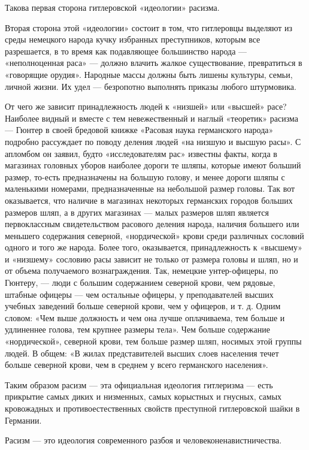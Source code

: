 \documentclass[12pt, a4paper, openany]{book}
\begin{document}
Такова первая сторона гитлеровской «идеологии» расизма.

Вторая сторона этой «идеологии» состоит в том, что гитлеровцы выделяют из среды немецкого народа кучку избранных преступников, которым все разрешается, в то время как подавляющее большинство народа — «неполноценная раса» — должно влачить жалкое существование, превратиться в «говорящие орудия». Народные массы должны быть лишены культуры, семьи, личной жизни. Их удел — безропотно выполнять приказы любого штурмовика.

От чего же зависит принадлежность людей к «низшей» или «высшей» расе? Наиболее видный и вместе с тем невежественный и наглый «теоретик» расизма — Гюнтер в своей бредовой книжке «Расовая наука германского народа» подробно рассуждает по поводу деления людей «на низшую и высшую расы». С апломбом он заявил, будто «исследователям рас» известны факты, когда в магазинах головных уборов наиболее дороги те шляпы, которые имеют больший размер, то-есть предназначены на большую голову, и менее дороги шляпы с маленькими номерами, предназначенные на небольшой размер головы. Так вот оказывается, что наличие в магазинах некоторых германских городов больших размеров шляп, а в других магазинах — малых размеров шляп является первоклассным свидетельством расового деления народа, наличия большего или меньшего содержания северной, «нордической» крови среди различных сословий одного и того же народа. Более того, оказывается, принадлежность к «высшему» и «низшему» сословию расы зависит не только от размера головы и шляп, но и от объема получаемого вознаграждения. Так, немецкие унтер-офицеры, по Гюнтеру, — люди с большим содержанием северной крови, чем рядовые, штабные офицеры — чем остальные офицеры, у преподавателей высших учебных заведений больше северной крови, чем у офицеров, и т. д. Одним словом: «Чем выше должность и чем она лучше оплачиваема, тем больше и удлиненнее голова, тем крупнее размеры тела». Чем больше содержание «нордической», северной крови, тем больше размер шляп, носимых этой группы людей. В общем: «В жилах представителей высших слоев населения течет больше северной крови, чем в среднем у всего германского населения».


Таким образом расизм — эта официальная идеология гитлеризма — есть прикрытие самых диких и низменных, самых корыстных и гнусных, самых кровожадных и противоестественных свойств преступной гитлеровской шайки в Германии. 

Расизм — это идеология современного разбоя и человеконенавистничества.
\end{document}
